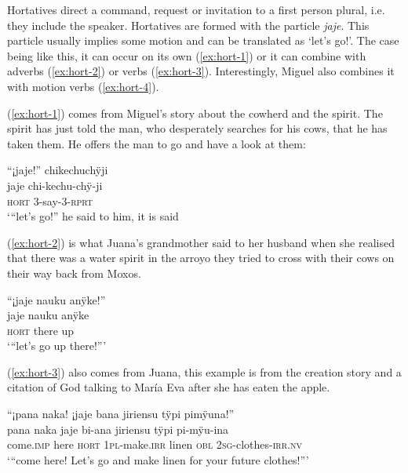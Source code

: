 Hortatives direct a command, request or invitation to a first person plural, i.e. they include the speaker. Hortatives are formed with the particle \textit{jaje}. This particle usually implies some motion and can be translated as ‘let’s go!’. The case being like this, it can occur on its own (\ref{ex:hort-1}) or it can combine with adverbs (\ref{ex:hort-2}) or verbs (\ref{ex:hort-3}). Interestingly, Miguel also combines it with motion verbs (\ref{ex:hort-4}). 


(\ref{ex:hort-1}) comes from Miguel’s story about the cowherd and the spirit. The spirit has just told the man, who desperately searches for his cows, that he has taken them. He offers the man to go and have a look at them:

\ea\label{ex:hort-1}
\begingl
\glpreamble “¡jaje!” chikechuchÿji \\
\gla jaje chi-kechu-chÿ-ji\\
\glb \textsc{hort} 3-say-3-\textsc{rprt}\\
\glft ‘“let’s go!” he said to him, it is said
\endgl
\trailingcitation{[mxx-n151017l-1.36]}
\xe

(\ref{ex:hort-2}) is what Juana’s grandmother said to her husband when she realised that there was a water spirit in the arroyo they tried to cross with their cows on their way back from Moxos.

\ea\label{ex:hort-2}
\begingl
\glpreamble “¡jaje nauku anÿke!”\\
\gla jaje nauku anÿke\\
\glb \textsc{hort} there up\\
\glft ‘“let’s go up there!”’
\endgl
\trailingcitation{[jxx-p151016l-2.102]}
\xe

(\ref{ex:hort-3}) also comes from Juana, this example is from the creation story and a citation of God talking to María Eva after she has eaten the apple.

\ea\label{ex:hort-3}
\begingl
\glpreamble “¡pana naka! ¡jaje bana jiriensu tÿpi pimÿuna!”\\
\gla pana naka jaje bi-ana jiriensu tÿpi pi-mÿu-ina\\
\glb come.\textsc{imp} here \textsc{hort} 1\textsc{pl}-make.\textsc{irr} linen \textsc{obl} 2\textsc{sg}-clothes-\textsc{irr.nv}\\
\glft ‘“come here! Let’s go and make linen for your future clothes!”’
\endgl
\trailingcitation{[jxx-n101013s-1.503]}
\xe

